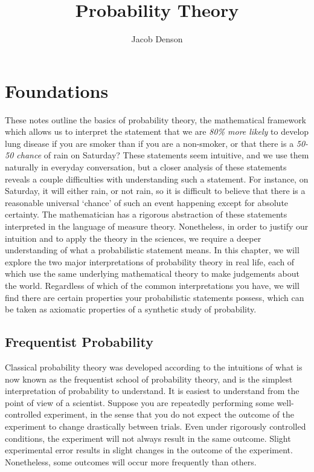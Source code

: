

\title{Probability Theory}
\author{Jacob Denson}



\maketitle
\tableofcontents
{}

\chapter{Foundations}

These notes outline the basics of probability theory, the mathematical framework which allows us to interpret the statement that we are {\it 80\% more likely} to develop lung disease if you are smoker than if you are a non-smoker, or that there is a {\it 50-50 chance} of rain on Saturday? These statements seem intuitive, and we use them naturally in everyday conversation, but a closer analysis of these statements reveals a couple difficulties with understanding such a statement. For instance, on Saturday, it will either rain, or not rain, so it is difficult to believe that there is a reasonable universal `chance' of such an event happening except for absolute certainty. The mathematician has a rigorous abstraction of these statements interpreted in the language of measure theory. Nonetheless, in order to justify our intuition and to apply the theory in the sciences, we require a deeper understanding of what a probabilistic statement means. In this chapter, we will explore the two major interpretations of probability theory in real life, each of which use the same underlying mathematical theory to make judgements about the world. Regardless of which of the common interpretations you have, we will find there are certain properties your probabilistic statements possess, which can be taken as axiomatic properties of a synthetic study of probability.

\section{Frequentist Probability}

Classical probability theory was developed according to the intuitions of what is now known as the frequentist school of probability theory, and is the simplest interpretation of probability to understand. It is easiest to understand from the point of view of a scientist. Suppose you are repeatedly performing some well-controlled experiment, in the sense that you do not expect the outcome of the experiment to change drastically between trials. Even under rigorously controlled conditions, the experiment will not always result in the same outcome. Slight experimental error results in slight changes in the outcome of the experiment. Nonetheless, some outcomes will occur more frequently than others.

